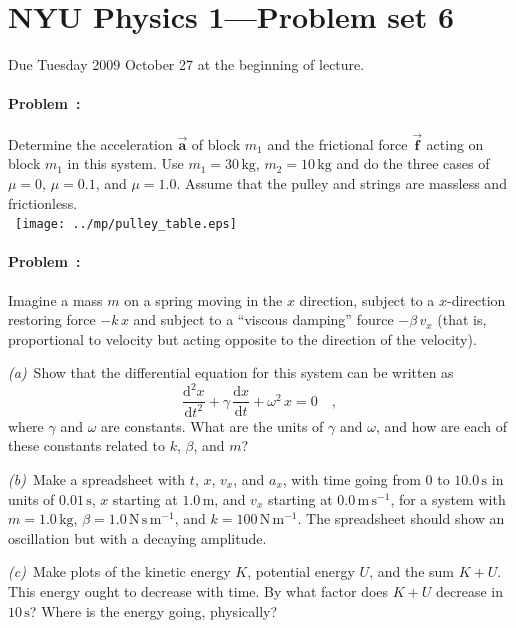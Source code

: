 \documentclass[12pt]{article}
\newcommand{\kg}{\mathrm{kg}}
\newcommand{\m}{\mathrm{m}}
\newcommand{\s}{\mathrm{s}}
\newcommand{\mps}{\m\,\s^{-1}}
\newcommand{\N}{\mathrm{N}}
\newcommand{\Npm}{\N\,\m^{-1}}
\newcommand{\Nspm}{\N\,\s\,\m^{-1}}
\renewcommand{\vector}[1]{\mathbf{\vec{#1}}}
\newcounter{problem}
\begin{document}
\thispagestyle{empty}

\section*{NYU Physics 1---Problem set 6}

Due Tuesday 2009 October 27 at the beginning of lecture.

\paragraph{Problem~\theproblem:}%
Determine the acceleration $\vector{a}$ of block $m_1$ and the
frictional force $\vector{f}$ acting on block $m_1$ in this system.
Use $m_1= 30\,\kg$, $m_2=10\,\kg$ and do the three cases of $\mu=0$,
$\mu=0.1$, and $\mu=1.0$.  Assume that the pulley and strings are
massless and frictionless.\\
~\hfill\texttt{[image: ../mp/pulley\_table.eps]}\hfill~

\paragraph{Problem~\theproblem:}%
Imagine a mass $m$ on a spring moving in the $x$ direction, subject to
a $x$-direction restoring force $-k\,x$ and subject to a ``viscous
damping'' fource $-\beta\,v_x$ (that is, proportional to velocity but
acting opposite to the direction of the velocity).

\textsl{(a)}~Show that the differential equation for this system can
be written as
\begin{equation}
\frac{\mathrm{d^2}x}{\mathrm{d}t^2}
+\gamma\,\frac{\mathrm{d}x}{\mathrm{d}t}
+\omega^2\,x = 0 \quad ,
\end{equation}
where $\gamma$ and $\omega$ are constants.  What are the units of
$\gamma$ and $\omega$, and how are each of these constants related to
$k$, $\beta$, and $m$?

\textsl{(b)}~Make a spreadsheet with $t$, $x$, $v_x$, and $a_x$, with
time going from 0 to $10.0\,\s$ in units of $0.01\,\s$, $x$ starting
at $1.0\,\m$, and $v_x$ starting at $0.0\,\mps$, for a system with
$m=1.0\,\kg$, $\beta=1.0\,\Nspm$, and $k=100\,\Npm$.  The spreadsheet
should show an oscillation but with a decaying amplitude.

\textsl{(c)}~Make plots of the kinetic energy $K$, potential energy
$U$, and the sum $K+U$.  This energy ought to decrease with time.  By
what factor does $K+U$ decrease in $10\,\s$?  Where is the energy
going, physically?
\end{document}
